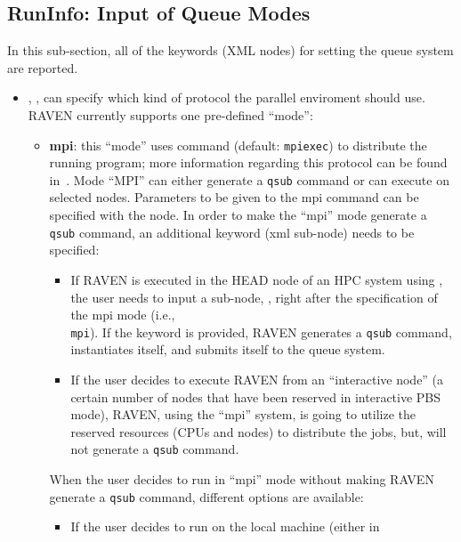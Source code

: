 \subsection{RunInfo: Input of Queue Modes}
\label{subsec:runinfoModes}
In this sub-section, all of the keywords (XML nodes) for setting the queue
system are reported.
\begin{itemize}
\item {}, , can specify which kind
of protocol the parallel enviroment should use.
%
RAVEN currently supports one pre-defined ``mode'':
  \begin{itemize}
    \item \textbf{mpi}: this ``mode'' uses   command (default: \texttt{mpiexec})
      to distribute the running program; more information regarding this protocol can be found
      in~\cite{MPI}.
      Mode ``MPI''  can either generate a \texttt{qsub} command or can execute
      on selected nodes.
      Parameters to be given to the mpi command can be specified with the  node.
      In order to make the ``mpi'' mode generate a \texttt{qsub} command, an
      additional keyword (xml sub-node) needs to be specified:
         \begin{itemize}
         \item If RAVEN is executed in the HEAD node of an HPC system using
           \cite{PBS}, the user needs to input a sub-node, ,
           right after the specification of the mpi mode (i.e.,\\
             \texttt{mpi}).
             If the keyword is provided, RAVEN generates a \texttt{qsub}
             command, instantiates itself, and submits itself to the queue
             system.
           \item If the user decides to execute RAVEN from an ``interactive
             node'' (a certain number of nodes that have been reserved in
             interactive PBS mode), RAVEN, using the ``mpi'' system, is going to
             utilize the reserved resources (CPUs and nodes) to distribute the
             jobs, but, will not generate a \texttt{qsub} command.
         \end{itemize}
     When the user decides to run in ``mpi'' mode without making RAVEN generate
     a \texttt{qsub} command, different options are available:
      \begin{itemize}
           \item If the user decides to run on the local machine (either in

\end{itemize}
\end{itemize}
\end{itemize}
